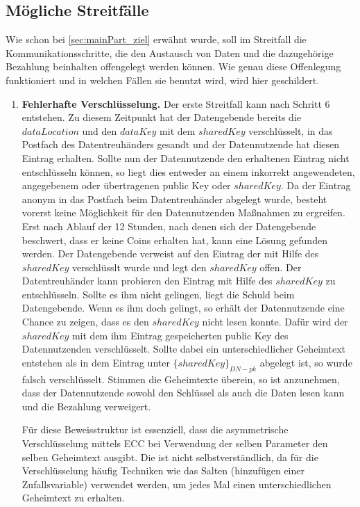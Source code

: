 \documentclass{scrreprt}
\begin{document}
\subsection{Mögliche Streitfälle}
\label{subsec:payStreit}
Wie schon bei \ref{sec:mainPart_ziel} erwähnt wurde, soll im Streitfall die Kommunikationsschritte, die den Austausch von Daten und die dazugehörige Bezahlung beinhalten offengelegt werden können. Wie genau diese Offenlegung funktioniert und in welchen Fällen sie benutzt wird, wird hier geschildert.\\

\begin{enumerate}
    \item \textbf{Fehlerhafte Verschlüsselung.}\label{case:IncorrectEncryption}
    Der erste Streitfall kann nach Schritt 6 entstehen. Zu diesem Zeitpunkt hat der Datengebende bereits die $dataLocation$ und den $dataKey$ mit dem $sharedKey$ verschlüsselt, in das Postfach des Datentreuhänders gesandt und der Datennutzende hat diesen Eintrag erhalten. Sollte nun der Datennutzende den erhaltenen Eintrag nicht entschlüsseln können, so liegt dies entweder an einem inkorrekt angewendeten, angegebenem oder übertragenen public Key oder $sharedKey$. Da der Eintrag anonym in das Postfach beim Datentreuhänder abgelegt wurde, besteht vorerst keine Möglichkeit für den Datennutzenden Maßnahmen zu ergreifen. Erst nach Ablauf der 12 Stunden, nach denen sich der Datengebende beschwert, dass er keine Coins erhalten hat, kann eine Lösung gefunden werden. Der Datengebende verweist auf den Eintrag der mit Hilfe des $sharedKey$ verschlüsslt wurde und legt den $sharedKey$ offen. Der Datentreuhänder kann probieren den Eintrag mit Hilfe des $sharedKey$ zu entschlüsseln. Sollte es ihm nicht gelingen, liegt die Schuld beim Datengebende. Wenn es ihm doch gelingt, so erhält der Datennutzende eine Chance zu zeigen, dass es den $sharedKey$ nicht lesen konnte. Dafür wird der $sharedKey$ mit dem ihm Eintrag gespeicherten public Key des Datennutzenden verschlüsselt. Sollte dabei ein unterschiedlicher Geheimtext entstehen als in dem Eintrag unter $\{sharedKey\}_{DN-pk}$ abgelegt ist, so wurde falsch verschlüsselt. Stimmen die Geheimtexte überein, so ist anzunehmen, dass der Datennutzende sowohl den Schlüssel als auch die Daten lesen kann und die Bezahlung verweigert. 

    Für diese Beweisstruktur ist essenziell, dass die asymmetrische Verschlüsselung mittels ECC bei Verwendung der selben Parameter den selben Geheimtext ausgibt. Die ist nicht selbstverständlich, da für die Verschlüsselung häufig Techniken wie das Salten (hinzufügen einer Zufallsvariable) verwendet werden, um jedes Mal einen unterschiedlichen Geheimtext zu erhalten.
    

\end{enumerate}
\end{document}
